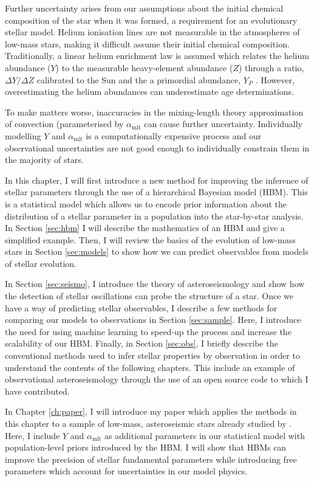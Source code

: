 Further uncertainty arises from our assumptions about the initial chemical composition of the star when it was formed, a requirement for an evolutionary stellar model. Helium ionisation lines are not measurable in the atmospheres of low-mass stars, making it difficult assume their initial chemical composition. Traditionally, a linear helium enrichment law is assumed which relates the helium abundance ($Y$) to the measurable heavy-element abundance ($Z$) through a ratio, $\Delta Y / \Delta Z$ calibrated to the Sun and the a primordial abundance, $Y_P$ \citep[see e.g.][]{Chiosi.Matteucci1982}. However, overestimating the helium abundances can underestimate age determinations.

To make matters worse, inaccuracies in the mixing-length theory approximation of convection (parameterised by $\alpha_\mathrm{mlt}$ can cause further uncertainty. Individually modelling $Y$ and $\alpha_\mathrm{mlt}$ is a computationally expensive process and our observational uncertainties are not good enough to individually constrain them in the majority of stars.

In this chapter, I will first introduce a new method for improving the inference of stellar parameters through the use of a hierarchical Bayesian model (HBM). This is a statistical model which allows us to encode prior information about the distribution of a stellar parameter in a population into the star-by-star analysis. In Section \ref{sec:hbm} I will describe the mathematics of an HBM and give a simplified example. Then, I will review the basics of the evolution of low-mass stars in Section \ref{sec:models} to show how we can predict observables from models of stellar evolution.

In Section \ref{sec:seismo}, I introduce the theory of asteroseismology and show how the detection of stellar oscillations can probe the structure of a star. Once we have a way of predicting stellar observables, I describe a few methods for comparing our models to observations in Section \ref{sec:sample}. Here, I introduce the need for using machine learning to speed-up the process and increase the scalability of our HBM. Finally, in Section \ref{sec:obs}, I briefly describe the conventional methods used to infer stellar properties by observation in order to understand the contents of the following chapters. This include an example of observational asteroseismology through the use of an open source code to which I have contributed.

In Chapter \ref{ch:paper}, I will introduce my paper which applies the methods in this chapter to a sample of low-mass, asteroseismic stars already studied by \citet{Serenelli.Johnson.ea2017}. Here, I include $Y$ and $\alpha_\mathrm{mlt}$ as additional parameters in our statistical model with population-level priors introduced by the HBM. I will show that HBMs can improve the precision of stellar fundamental parameters while introducing free parameters which account for uncertainties in our model physics.

